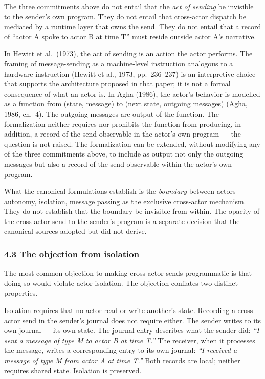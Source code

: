 \documentclass[
]{article}
\begin{document}
The three commitments above do not entail that the \emph{act of sending}
be invisible to the sender's own program. They do not entail that
cross-actor dispatch be mediated by a runtime layer that owns the send.
They do not entail that a record of ``actor A spoke to actor B at time
T'' must reside outside actor A's narrative.

In Hewitt et al.~(1973), the act of sending is an action the actor
performs. The framing of message-sending as a machine-level instruction
analogous to a hardware instruction (Hewitt et al., 1973, pp.~236--237)
is an interpretive choice that supports the architecture proposed in
that paper; it is not a formal consequence of what an actor is. In Agha
(1986), the actor's behavior is modelled as a function from (state,
message) to (next state, outgoing messages) (Agha, 1986, ch.~4). The
outgoing messages are output of the function. The formalization neither
requires nor prohibits the function from producing, in addition, a
record of the send observable in the actor's own program --- the
question is not raised. The formalization can be extended, without
modifying any of the three commitments above, to include as output not
only the outgoing messages but also a record of the send observable
within the actor's own program.

What the canonical formulations establish is the \emph{boundary} between
actors --- autonomy, isolation, message passing as the exclusive
cross-actor mechanism. They do not establish that the boundary be
invisible from within. The opacity of the cross-actor send to the
sender's program is a separate decision that the canonical sources
adopted but did not derive.

\subsubsection{4.3 The objection from
isolation}\label{the-objection-from-isolation}

The most common objection to making cross-actor sends programmatic is
that doing so would violate actor isolation. The objection conflates two
distinct properties.

Isolation requires that no actor read or write another's state.
Recording a cross-actor send in the sender's journal does not require
either. The sender writes to its own journal --- its own state. The
journal entry describes what the sender did: \emph{``I sent a message of
type M to actor B at time T.''} The receiver, when it processes the
message, writes a corresponding entry to its own journal: \emph{``I
received a message of type M from actor A at time T.''} Both records are
local; neither requires shared state. Isolation is preserved.
\end{document}
